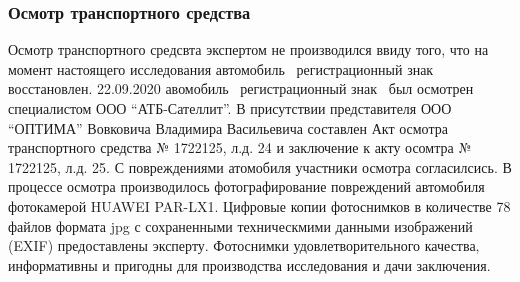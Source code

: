 \vspace{3mm}
%
%


\subsubsection{Осмотр транспортного средства}

Осмотр транспортного средсвта экспертом не производился ввиду того, что на момент настоящего исследования автомобиль  \, регистрационный знак  \, восстановлен.
22.09.2020 авомобиль  \, регистрационный знак \, был осмотрен специалистом ООО \enquote{АТБ-Сателлит}. В присутствии представителя ООО \enquote{ОПТИМА} Вовковича Владимира Васильевича составлен Акт осмотра  транспортного средства № 1722125, л.д. 24 и заключение к акту осомтра  № 1722125, л.д. 25. С повреждениями атомобиля участники осмотра согласилсись.  В процессе осмотра производилось фотографирование повреждений автомобиля \, фотокамерой HUAWEI PAR-LX1. Цифровые копии фотоснимков в количестве 78 файлов формата jpg  с сохраненными техническмими данными изображений (EXIF) предоставлены эксперту. Фотоснимки удовлетворительного качества, информативны и пригодны для производства исследования и дачи заключения.

